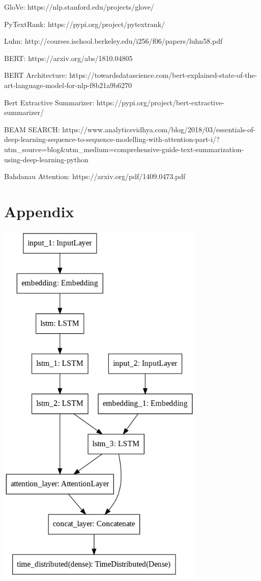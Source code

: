 \documentclass[fleqn,10pt]{SelfArx} %
\begin{document}


GloVe: https://nlp.stanford.edu/projects/glove/

PyTextRank: https://pypi.org/project/pytextrank/

Luhn: http://courses.ischool.berkeley.edu/i256/f06/papers/luhn58.pdf

BERT: https://arxiv.org/abs/1810.04805

BERT Architecture: https://towardsdatascience.com/bert-explained-state-of-the-art-language-model-for-nlp-f8b21a9b6270

Bert Extractive Summarizer: https://pypi.org/project/bert-extractive-summarizer/

BEAM SEARCH: https://www.analyticsvidhya.com/blog/2018/03/essentials-of-deep-learning-sequence-to-sequence-modelling-with-attention-part-i/?utm_source=blog&utm_medium=comprehensive-guide-text-summarization-using-deep-learning-python 

Bahdanau Attention: https://arxiv.org/pdf/1409.0473.pdf\\
\clearpage
\onecolumn
\section*{Appendix}
\par
{\centering\vspace{10pt}
\includegraphics[height=18cm]{model.png}
\vspace{10pt}
\par}
\end{document}
